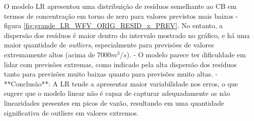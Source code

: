 O modelo LR apresentou uma distribuição de resíduos semelhante ao CB em termos de concentração em torno de zero para valores previstos mais baixos - figura \ref{fig:grande_LR_WFV_ORIG_RESID_x_PREV}. No entanto, a dispersão dos resíduos é maior dentro do intervalo mostrado no gráfico, e há uma maior quantidade de \textit{outliers}, especialmente para previsões de valores extremamente altos (acima de $7000 m^3/s$).
- O modelo parece ter dificuldade em lidar com previsões extremas, como indicado pela alta dispersão dos resíduos tanto para previsões muito baixas quanto para previsões muito altas.
- **Conclusão**: A LR tende a apresentar maior variabilidade nos erros, o que sugere que o modelo linear não é capaz de capturar adequadamente as não linearidades presentes em picos de vazão, resultando em uma quantidade significativa de outliers em valores extremos.


